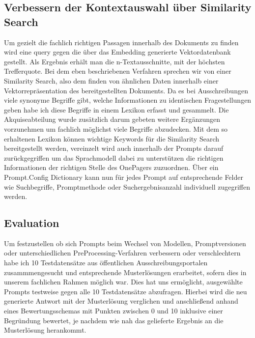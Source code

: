 \subsection{Verbessern der Kontextauswahl über Similarity Search}
\label{chap:Verbessern der Kontextauswahl über Similarity Search}
Um gezielt die fachlich richtigen Passagen innerhalb des Dokuments zu finden wird eine query gegen die über das
Embedding generierte Vektordatenbank gestellt. Als Ergebnis erhält man die n-Textausschnitte, mit der höchsten
Trefferquote. Bei dem eben beschriebenen Verfahren sprechen wir von einer Similarity Search, also dem finden von
ähnlichen Daten innerhalb einer Vektorrepräsentation des bereitgestellten Dokuments. Da es bei Ausschreibungen viele
synonyme Begriffe gibt, welche Informationen zu identischen Fragestellungen geben habe ich diese Begriffe in einem
Lexikon erfasst und gesammelt. Die Akquiseabteilung wurde zusätzlich darum gebeten weitere Ergänzungen vorzunehmen um
fachlich möglichst viele Begriffe abzudecken. Mit dem so erhaltenen Lexikon können wichtige Keywords für die Similarity
Search bereitgestellt werden, vereinzelt wird auch innerhalb der Prompts darauf zurückgegriffen um das Sprachmodell
dabei zu unterstützen die richtigen Informationen der richtigen Stelle des OnePagers zuzuordnen. Über ein Prompt.Config
Dictionary kann nun für jedes Prompt auf entsprechende Felder wie Suchbegriffe, Promptmethode oder Suchergebnisanzahl
individuell zugegriffen werden.

\subsection{Evaluation} 
\label{chap:Evaluation}   
Um festzustellen ob sich Prompts beim Wechsel von Modellen, Promptversionen oder unterschiedlichen PreProcessing-Verfahren verbessern oder verschlechtern 
habe ich 10 Testdatensätze aus öffentlichen Ausschreibungsportalen zusammmengesucht und entsprechende Musterlösungen erarbeitet, sofern dies in unserem 
fachlichen Rahmen möglich war. Dies hat uns ermöglicht, ausgewählte Prompts testweise gegen alle 10 Testdatensätze abzufragen. Hierbei wird die neu 
generierte Antwort mit der Musterlösung verglichen und anschließend anhand eines Bewertungsschemas mit Punkten zwischen 0 und 10 inklusive einer 
Begründung bewertet, je nachdem wie nah das gelieferte Ergebnis an die Musterlösung herankommt.    

